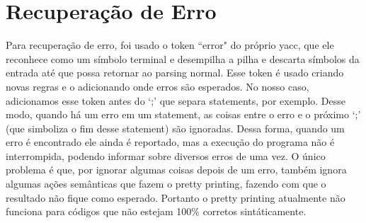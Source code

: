 \section{Recuperação de Erro}
Para recuperação de erro, foi usado o token ``error" do próprio yacc, que ele reconhece como um símbolo terminal e desempilha a pilha e descarta símbolos da entrada até que possa retornar ao parsing normal. Esse token é usado criando novas regras e o adicionando onde erros são esperados. No nosso caso, adicionamos esse token antes do `;' que separa statements, por exemplo. Desse modo, quando há um erro em um statement, as coisas entre o erro e o próximo `;' (que simboliza o fim desse statement) são ignoradas. Dessa forma, quando um erro é encontrado ele ainda é reportado, mas a execução do programa não é interrompida, podendo informar sobre diversos erros de uma vez. O único problema é que, por ignorar algumas coisas depois de um erro, também ignora algumas ações semânticas que fazem o pretty printing, fazendo com que o resultado não fique como esperado. Portanto o pretty printing atualmente não funciona para códigos que não estejam 100\% corretos sintáticamente.